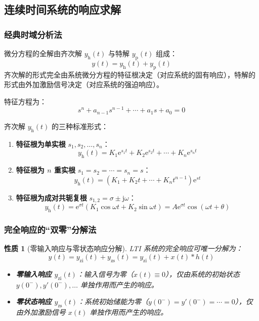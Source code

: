 \documentclass[11pt,a4paper,fontset=fandol]{ctexart}
\newtheorem{property}[theorem]{性质}
\theoremstyle{remark}
\begin{document}
\subsection{连续时间系统的响应求解}

\subsubsection{经典时域分析法}
微分方程的全解由齐次解 $y_{\mathrm{h}}(t)$ 与特解 $y_{\mathrm{p}}(t)$ 组成：
\begin{equation}
    y(t) = y_{\mathrm{h}}(t) + y_{\mathrm{p}}(t)
\end{equation}
齐次解的形式完全由系统微分方程的特征根决定（对应系统的固有响应），特解的形式由外加激励信号决定（对应系统的强迫响应）。

特征方程为：
\begin{equation}
    s^n + a_{n-1}s^{n-1} + \cdots + a_1 s + a_0 = 0
\end{equation}

齐次解 $y_{\mathrm{h}}(t)$ 的三种标准形式：
\begin{enumerate}
    \item \textbf{特征根为单实根} $s_1, s_2, \dots, s_n$：
    \begin{equation}
        y_{\mathrm{h}}(t) = K_1 \mathrm{e}^{s_1 t} + K_2 \mathrm{e}^{s_2 t} + \cdots + K_n \mathrm{e}^{s_n t}
    \end{equation}
    \item \textbf{特征根为 $n$ 重实根} $s_1 = s_2 = \cdots = s_n = s$：
    \begin{equation}
        y_{\mathrm{h}}(t) = (K_1 + K_2 t + \cdots + K_n t^{n-1})\mathrm{e}^{st}
    \end{equation}
    \item \textbf{特征根为成对共轭复根} $s_{1,2} = \sigma \pm \mathrm{j}\omega$：
    \begin{equation}
        y_{\mathrm{h}}(t) = \mathrm{e}^{\sigma t}(K_1 \cos\omega t + K_2 \sin\omega t) = A \mathrm{e}^{\sigma t} \cos(\omega t + \theta)
    \end{equation}
\end{enumerate}

\subsubsection{完全响应的“双零”分解法}
\begin{property}[零输入响应与零状态响应分解]
LTI 系统的完全响应可唯一分解为：
\begin{equation}
    y(t) = y_{\mathrm{zi}}(t) + y_{\mathrm{zs}}(t) = y_{\mathrm{zi}}(t) + x(t) * h(t)
\end{equation}
\begin{itemize}
    \item \textbf{零输入响应 $y_{\mathrm{zi}}(t)$}：输入信号为零（$x(t) \equiv 0$），仅由系统的初始状态 $y(0^-), y'(0^-), \dots$ 单独作用而产生的响应。
    \item \textbf{零状态响应 $y_{\mathrm{zs}}(t)$}：系统初始储能为零（$y(0^-) = y'(0^-) = \cdots = 0$），仅由外加激励信号 $x(t)$ 单独作用而产生的响应。
\end{itemize}
\end{property}
\end{document}
